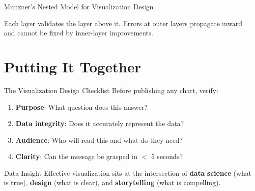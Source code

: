\documentclass[10pt]{beamer}
\begin{document}
\begin{frame}{Munzner's Nested Model for Visualization Design}
  \begin{center}
  \end{center}

  \vspace{4pt}
  Each layer validates the layer above it. Errors at outer layers
  propagate inward and cannot be fixed by inner-layer improvements.
\end{frame}

\section{Putting It Together}

\begin{frame}{The Visualization Design Checklist}
  Before publishing any chart, verify:
  \begin{enumerate}
    \item \textbf{Purpose}: What question does this answer?
    \item \textbf{Data integrity}: Does it accurately represent the data?
    \item \textbf{Audience}: Who will read this and what do they need?
    \item \textbf{Clarity}: Can the message be grasped in $<$ 5 seconds?
  \end{enumerate}

  \vspace{6pt}
  \begin{exampleblock}{Data Insight}
    Effective visualization sits at the intersection of
    \textbf{data science} (what is true),
    \textbf{design} (what is clear), and
    \textbf{storytelling} (what is compelling).
  \end{exampleblock}
\end{frame}
\end{document}
